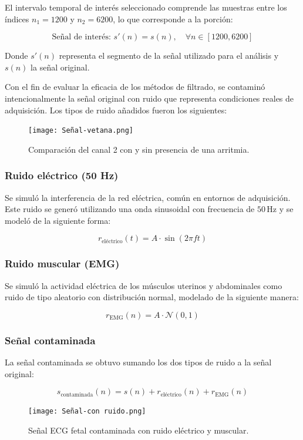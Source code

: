 \documentclass[10pt, conference]{IEEEtran}
\begin{document}
El intervalo temporal de interés seleccionado comprende las muestras entre los índices \( n_1 = 1200 \) y \( n_2 = 6200 \), lo que corresponde a la porción:

\[
\text{Señal de interés: } s'(n) = s(n), \quad \forall n \in [1200, 6200]
\]

Donde \( s'(n) \) representa el segmento de la señal utilizado para el análisis y \( s(n) \) la señal original.

Con el fin de evaluar la eficacia de los métodos de filtrado, se contaminó intencionalmente la señal original con ruido que representa condiciones reales de adquisición. Los tipos de ruido añadidos fueron los siguientes:

\begin{figure}[htbp]
	\centerline{\texttt{[image: Señal-vetana.png]}}
	\caption{Comparación del canal 2 con y sin presencia de una arritmia.}
	\label{fig:ecg_sano}
\end{figure}

\subsubsection{Ruido eléctrico (50 Hz)}
Se simuló la interferencia de la red eléctrica, común en entornos de adquisición. Este ruido se generó utilizando una onda sinusoidal con frecuencia de \( 50 \, \text{Hz} \) y se modeló de la siguiente forma:

\[
r_{\text{eléctrico}}(t) = A \cdot \sin(2 \pi f t)
\]

\subsubsection{Ruido muscular (EMG)}
Se simuló la actividad eléctrica de los músculos uterinos y abdominales como ruido de tipo aleatorio con distribución normal, modelado de la siguiente manera:

\[
r_{\text{EMG}}(n) = A \cdot \mathcal{N}(0, 1)
\]

\subsubsection{Señal contaminada}
La señal contaminada se obtuvo sumando los dos tipos de ruido a la señal original:

\[
s_{\text{contaminada}}(n) = s(n) + r_{\text{eléctrico}}(n) + r_{\text{EMG}}(n)
\]

\begin{figure}[htbp]
	\centerline{\texttt{[image: Señal-con ruido.png]}}
	\caption{Señal ECG fetal contaminada con ruido eléctrico y muscular.}
	\label{fig:signal_with_noise}
\end{figure}
\end{document}
